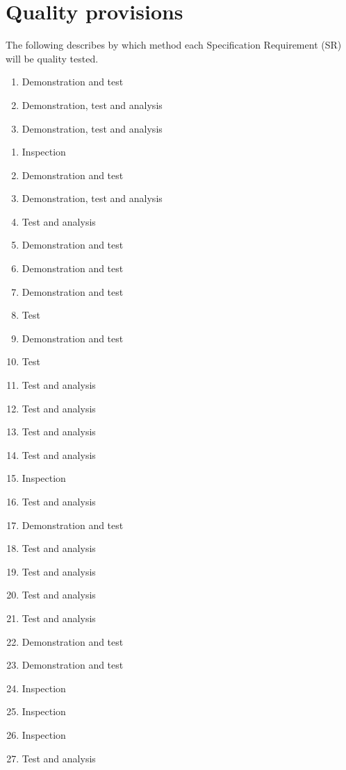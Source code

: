 \documentclass[Main]{subfiles}
\begin{document}
\chapter{Quality provisions}
The following describes by which method each Specification Requirement (SR) will be quality tested.

\begin{enumerate}[{SR}-1:]
\setcounter{enumi}{0}
\item Demonstration and test
\item Demonstration, test and analysis
\item Demonstration, test and analysis
\end{enumerate}

\begin{enumerate}[{SR}-1:]
\setcounter{enumi}{0}

\item Inspection
\item Demonstration and test
\item Demonstration, test and analysis
\item Test and analysis

\item Demonstration and test
\item Demonstration and test
\item Demonstration and test
\item Test

\item Demonstration and test 
\item Test

\item Test and analysis
\item Test and analysis
\item Test and analysis

\item Test and analysis

\item Inspection 
\item Test and analysis
\item Demonstration and test

\item Test and analysis

\item Test and analysis
\item Test and analysis
\item Test and analysis

\item Demonstration and test
\item Demonstration and test

\item Inspection
\item Inspection
\item Inspection
\item Test and analysis
	
	
\end{enumerate}
\end{document}
